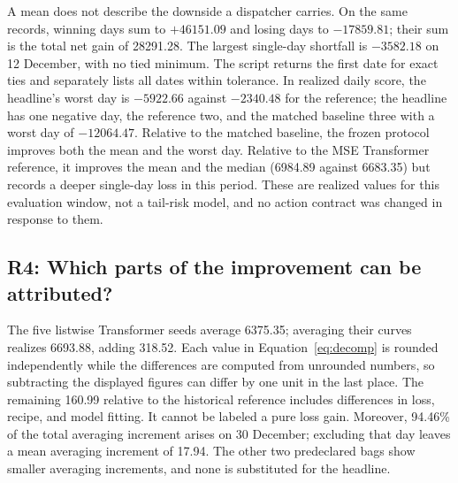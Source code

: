 \documentclass[11pt,a4paper]{article}
\begin{document}
A mean does not describe the downside a dispatcher carries. On the same records, winning days sum to $+46151.09$ and losing days to $-17859.81$; their sum is the total net gain of 28291.28. The largest single-day shortfall is $-3582.18$ on 12 December, with no tied minimum. The script returns the first date for exact ties and separately lists all dates within tolerance. In realized daily score, the headline's worst day is $-5922.66$ against $-2340.48$ for the reference; the headline has one negative day, the reference two, and the matched baseline three with a worst day of $-12064.47$. Relative to the matched baseline, the frozen protocol improves both the mean and the worst day. Relative to the MSE Transformer reference, it improves the mean and the median (6984.89 against 6683.35) but records a deeper single-day loss in this period. These are realized values for this evaluation window, not a tail-risk model, and no action contract was changed in response to them.

\FloatBarrier
\subsection{R4: Which parts of the improvement can be attributed?}
\EqDecomposition

The five listwise Transformer seeds average 6375.35; averaging their curves realizes 6693.88, adding 318.52. Each value in Equation~\eqref{eq:decomp} is rounded independently while the differences are computed from unrounded numbers, so subtracting the displayed figures can differ by one unit in the last place. The remaining 160.99 relative to the historical reference includes differences in loss, recipe, and model fitting. It cannot be labeled a pure loss gain. Moreover, 94.46\% of the total averaging increment arises on 30 December; excluding that day leaves a mean averaging increment of 17.94. The other two predeclared bags show smaller averaging increments, and none is substituted for the headline.
\end{document}

